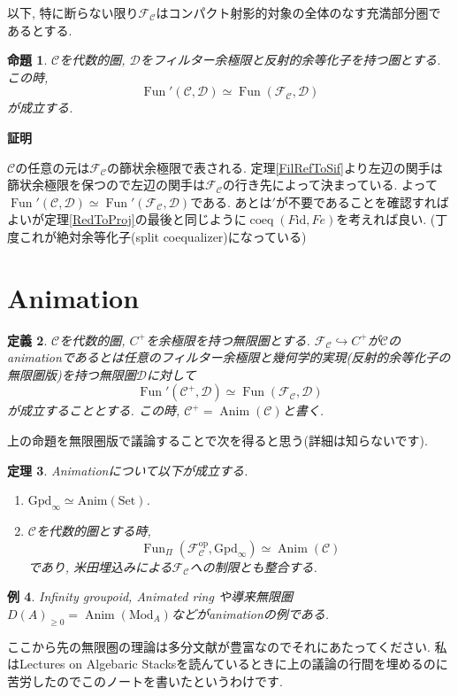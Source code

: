 \documentclass{ltjsarticle}
\makeatletter
\theoremstyle{mystyle}
\newtheorem{theorem}{定理}[section]
\newtheorem{dfn}[theorem]{定義}
\newtheorem{prop}[theorem]{命題}
\newtheorem{ex}[theorem]{例}       %
\renewcommand{\proofname}{\textbf{証明}}
\renewenvironment{proof}[1][\proofname]{\par
  \pushQED{\qed}
  \normalfont \topsep6\p@\@plus6\p@\relax
  \trivlist
  \item\relax
  {#1\@addpunct{\newline\ignorespaces}}%
}{
  \popQED\endtrivlist\@endpefalse
}
\DeclareMathOperator{\Fun}{Fun}
\makeatother
\begin{document}
以下, 特に断らない限り$\mathcal F_{\mathcal C}$はコンパクト射影的対象の全体のなす充満部分圏であるとする.
\begin{prop}
$\mathcal C$を代数的圏, $\mathcal D$をフィルター余極限と反射的余等化子を持つ圏とする.
この時,
\[\Fun'(\mathcal C,\mathcal D)\simeq \Fun(\mathcal F_{\mathcal C}, \mathcal D)\]
が成立する.
\end{prop}
\begin{proof}
  $\mathcal C$の任意の元は$\mathcal F_{\mathcal C}$の篩状余極限で表される.
  定理\ref{FilRefToSif}より左辺の関手は篩状余極限を保つので左辺の関手は$\mathcal F_{\mathcal C}$の行き先によって決まっている.
  よって$\Fun'(\mathcal C,\mathcal D)\simeq\Fun'(\mathcal F_{\mathcal C},\mathcal D)$である.
  あとは$'$が不要であることを確認すればよいが定理\ref{RedToProj}の最後と同じように$\operatorname{coeq}(F\mathrm{id},Fe)$を考えれば良い.
  (丁度これが絶対余等化子(split coequalizer)になっている)
\end{proof}

\section{Animation}
\begin{dfn}
  $\mathcal C$を代数的圏, $C^+$を余極限を持つ無限圏とする.
  $\mathcal F_{\mathcal C}\hookrightarrow C^+$が$\mathcal C$のanimationであるとは任意のフィルター余極限と幾何学的実現(反射的余等化子の無限圏版)を持つ無限圏$\mathcal D$に対して
  \[\Fun'(\mathcal C^+,\mathcal D)\simeq\Fun(\mathcal F_{\mathcal C},\mathcal D)\]
  が成立することとする. この時, $\mathcal C^+=\operatorname{Anim}(\mathcal C)$と書く.
\end{dfn}
上の命題を無限圏版で議論することで次を得ると思う(詳細は知らないです).
\begin{theorem}
  Animationについて以下が成立する.
  \begin{enumerate}
    \item $\mathrm{Gpd}_{\infty}\simeq \mathrm{Anim}(\mathrm{Set})$.
    \item $\mathcal C$を代数的圏とする時,
    \[\Fun_{\Pi}(\mathcal F_{\mathcal C}^{\mathrm{op}}, \mathrm{Gpd}_{\infty})\simeq\operatorname{Anim}(\mathcal C)\]
    であり, 米田埋込みによる$\mathcal F_{\mathcal C}$への制限とも整合する.
  \end{enumerate}
\end{theorem}
\begin{ex}
  Infinity groupoid, Animated ring や導来無限圏$D(A)_{\geq0}=\operatorname{Anim}(\mathrm{Mod}_A)$などがanimationの例である.
\end{ex}

ここから先の無限圏の理論は多分文献が豊富なのでそれにあたってください. 私はLectures on Algebaric Stacks\cite{AlgStk}を読んているときに上の議論の行間を埋めるのに苦労したのでこのノートを書いたというわけです. 



\nocite{*} %
\printbibliography[title=参考文献]
\end{document}
